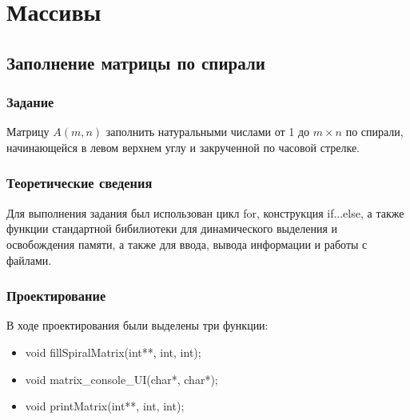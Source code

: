 \documentclass[12pt,a4paper]{report}
\begin{document}
%
\chapter{Массивы}
\section{Заполнение матрицы по спирали}
\subsection{Задание}
\hspace{\parindent}
Матрицу $A(m,n)$ заполнить натуральными числами от 1 до $m \times n$ по спирали, начинающейся в левом верхнем углу и закрученной по часовой стрелке.

\subsection{Теоретические сведения}
\hspace{\parindent}
Для выполнения задания был использован цикл for, конструкция if...else, а также функции стандартной бибилиотеки для динамического выделения и освобождения памяти, а также для ввода, вывода информации и работы с файлами.

\subsection{Проектирование}
\hspace{\parindent} 
В ходе проектирования были выделены три функции:

\begin{itemize}
\item void fillSpiralMatrix(int**, int, int);
\item void matrix\_console\_UI(char*, char*);
\item void printMatrix(int**, int, int);
\end{itemize}
\end{document}
